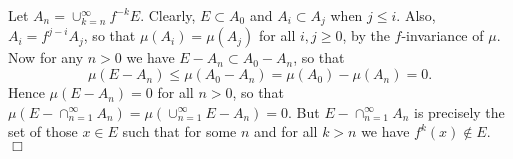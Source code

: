 \documentclass[12pt]{article}
\begin{document}
Let $A_n= \cup_{k=n}^\infty f^{-k}E$. Clearly, $E\subset A_0$ and
$A_i\subset A_j$ when $j\leq i$. Also, $A_i =
f^{j-i}A_j$, so that $\mu(A_i)=\mu(A_j)$ for all $i,j\geq 0$, by
the $f$-invariance of $\mu$.
Now for any $n>0$ we have $E-A_n\subset A_0-A_n$, so that
$$\mu(E-A_n) \leq \mu(A_0-A_n) = \mu(A_0) - \mu(A_n) = 0.$$
Hence $\mu(E-A_n)=0$ for all $n>0$, so that
$\mu(E-\cap_{n=1}^\infty A_n) = \mu(\cup_{n=1}^\infty E-A_n)=0$.
But $E-\cap_{n=1}^\infty A_n$ is precisely the set of those $x\in E$ such
that for some $n$ and for all $k>n$ we have $f^k(x)\notin E$. $\Box$
\end{document}
